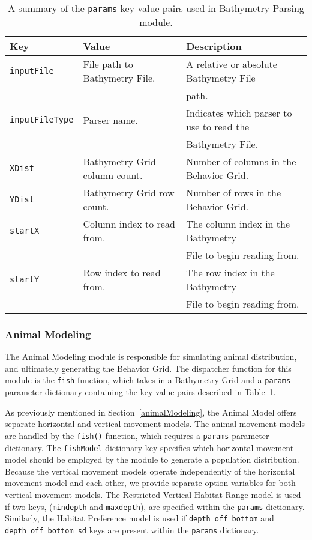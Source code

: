 \begin{table}[ht]
	\begin{tabular}{l l l}
		Key						&	Value 								&	Description\\
		\hline
		\texttt{inputFile}		& 	File path to Bathymetry File.		&	A relative or absolute Bathymetry File\\
								&										&	path.\\
		\texttt{inputFileType}	& 	Parser name.						&	Indicates which parser to use to read the \\
								&										&	Bathymetry File.\\
		\texttt{XDist}			&	Bathymetry Grid column count.			&	Number of columns in the Behavior Grid.\\
		\texttt{YDist}			&	Bathymetry Grid row count.			&	Number of rows in the Behavior 	Grid.\\		
		\texttt{startX}			& 	Column index to read from. 			& 	The column index in the Bathymetry\\
								&										&   File to	begin reading from.\\
		\texttt{startY}			& 	Row index to read from.				&	The row index in the Bathymetry\\
								&										&	File to begin reading from.\\
	\end{tabular}
	\caption{A summary of the \texttt{params} key-value pairs used in Bathymetry Parsing module.
		\label{bathyParams}}
\end{table}

\subsubsection{Animal Modeling}
	
The Animal Modeling module is responsible for simulating animal distribution, and ultimately generating the Behavior Grid.  The dispatcher function for this module is the \texttt{fish} function, which takes in a Bathymetry Grid and a \texttt{params} parameter dictionary containing the key-value pairs described in Table~\ref{bathyParams}.

As previously mentioned in Section~\ref{animalModeling}, the Animal Model offers separate horizontal and vertical movement models.  The animal movement models are handled by the \texttt{fish()} function, which requires a \texttt{params} parameter dictionary.  The \texttt{fishModel} dictionary key specifies which horizontal movement model should be employed by the module to generate a population distribution.  Because the vertical movement models operate independently of the horizontal movement model and each other, we provide separate option variables for both vertical movement models.  The Restricted Vertical Habitat Range model is used if two keys, (\texttt{mindepth} and \texttt{maxdepth}), are specified within the \texttt{params} dictionary.  Similarly, the Habitat Preference model is used if \texttt{depth\_off\_bottom} and \texttt{depth\_off\_bottom\_sd} keys are present within the \texttt{params} dictionary.  

